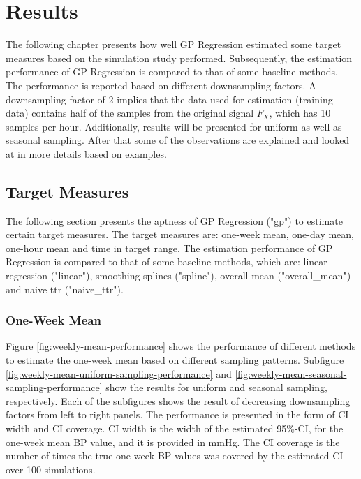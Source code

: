 \chapter{Results}\label{ch:results}

The following chapter
presents how well GP Regression estimated
some target measures based on the simulation study performed.
Subsequently, the estimation performance of GP Regression is compared to that of some
baseline methods.
The performance is reported based on different downsampling factors.
A downsampling factor of 2 implies that the data used for estimation
(training data) contains half of the samples from the original signal $F_X$,
which has 10 samples per hour.
Additionally, results will be presented for uniform as well as seasonal sampling.
After that some of the observations are explained and looked at in more details
based on examples.

\section{Target Measures}

The following section
presents the aptness of GP Regression ("gp") to estimate certain target measures.
The target measures are: one-week mean, one-day mean, one-hour mean and time in target
range.
The estimation performance of GP Regression is compared to that of some
baseline methods, which are: linear regression ("linear"),
smoothing splines ("spline"), overall mean ("overall\_mean") and naive ttr ("naive\_ttr").

\subsection{One-Week Mean}

Figure \ref{fig:weekly-mean-performance} shows the performance
of different methods to
estimate the one-week mean based on different
sampling patterns. 
Subfigure \ref{fig:weekly-mean-uniform-sampling-performance} 
and \ref{fig:weekly-mean-seasonal-sampling-performance} show
the results for uniform and seasonal sampling, respectively.
Each of the subfigures shows the result of decreasing downsampling
factors from left to right panels.
The performance is presented in the form of CI width and CI coverage.
CI width is the width of the estimated 95\%-CI, for the
one-week mean BP value, and it is provided in mmHg.
The CI coverage is the number of times the true one-week BP values
was covered by the estimated CI over 100 simulations.

